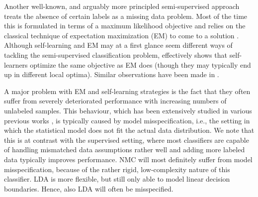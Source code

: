 \documentclass[twoside]{memoir}\usepackage[]{graphicx}\usepackage{xcolor}
\renewcommand{\cite}{\citep}
\begin{document}
Another well-known, and arguably more principled semi-supervised approach treats the absence of certain labels as a missing data problem. Most of the time this is formulated in terms of a maximum likelihood objective \cite{Dempster1977} and relies on the classical technique of expectation maximization (EM) to come to a solution \cite{nigam98a,ONeill1978}. Although self-learning and EM may at a first glance seem different ways of tackling the semi-supervised classification problem, \cite{basu02a} effectively shows that self-learners optimize the same objective as EM does (though they may typically end up in different local optima). Similar observations have been made in \cite{Abney2004,Haffari2007}.

A major problem with EM and self-learning strategies is the fact that they often suffer from severely deteriorated performance with increasing numbers of unlabeled samples. This behaviour, which has been extensively studied in various previous works \cite{cohen04a,Cozman2006,Loog2014a,yang2011effect}, is typically caused by model misspecification, i.e., the setting in which the statistical model does not fit the actual data distribution.  We note that this is at contrast with the supervised setting, where most classifiers are capable of handling mismatched data assumptions rather well and adding more labeled data typically improves performance.  NMC will most definitely suffer from model misspecification, because of the rather rigid, low-complexity nature of this classifier.  LDA is more flexible, but still only able to model linear decision boundaries.  Hence, also LDA will often be misspecified.
\end{document}
